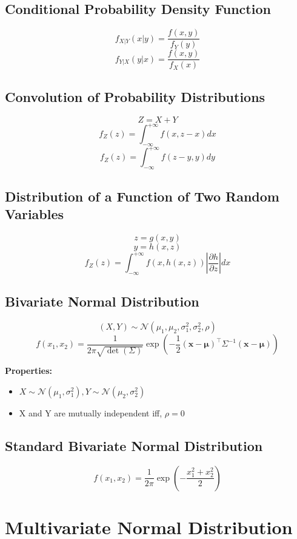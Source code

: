 \documentclass{article}
\begin{document}
\subsection{Conditional Probability Density Function}
\[
    f_{X|Y}(x|y) = \frac{f(x,y)}{f_Y(y)}
\]
\[
    f_{Y|X}(y|x) = \frac{f(x,y)}{f_X(x)}
\]

\subsection{Convolution of Probability Distributions}
\[
    Z = X + Y
\]
\[
    f_Z(z) = \int_{-\infty}^{+\infty} f(x,z-x)dx
\]
\[
    f_Z(z) = \int_{-\infty}^{+\infty} f(z-y,y)dy
\]

\subsection{Distribution of a Function of Two Random Variables}
\[
    z=g(x,y)
\]
\[
    y=h(x,z)
\]
\[
    f_Z(z) = \int_{-\infty}^{+\infty} f(x,h(x,z)) \left| \frac{\partial h}{\partial z} \right| dx
\]

\subsection{Bivariate Normal Distribution}
\[ (X,Y) \sim \mathcal{N}(\mu_1, \mu_2, \sigma_1^2, \sigma_2^2, \rho) \]
\[
    f(x_1, x_2) = \frac{1}{2\pi\sqrt{\det(\Sigma)}} \exp\left(-\frac{1}{2}(\mathbf{x} - \boldsymbol{\mu})^\top \Sigma^{-1} (\mathbf{x} - \boldsymbol{\mu})\right)
\]

\textbf{Properties:}
\begin{itemize}
    \item \( X \sim \mathcal{N}(\mu_1, \sigma_1^2), Y \sim \mathcal{N}(\mu_2, \sigma_2^2) \)
    \item X and Y are mutually independent iff, \( \rho = 0 \)
\end{itemize}

\subsection{Standard Bivariate Normal Distribution}
\[
    f(x_1, x_2) = \frac{1}{2\pi} \exp\left(-\frac{x_1^2 + x_2^2}{2}\right)
\]

\newpage
\section{Multivariate Normal Distribution}
\end{document}
